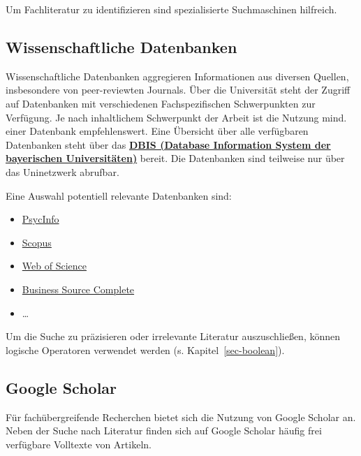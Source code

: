 \documentclass[
  letterpaper,
  DIV=11]{scrreprt}
\begin{document}
Um Fachliteratur zu identifizieren sind spezialisierte Suchmaschinen
hilfreich.

\subsection{Wissenschaftliche
Datenbanken}\label{wissenschaftliche-datenbanken}

Wissenschaftliche Datenbanken aggregieren Informationen aus diversen
Quellen, insbesondere von peer-reviewten Journals. Über die Universität
steht der Zugriff auf Datenbanken mit verschiedenen Fachspezifischen
Schwerpunkten zur Verfügung. Je nach inhaltlichem Schwerpunkt der Arbeit
ist die Nutzung mind. einer Datenbank empfehlenswert. Eine Übersicht
über alle verfügbaren Datenbanken steht über das
\textbf{\href{https://ub.fau.de/recherchieren/datenbanken/}{DBIS
(Database Information System der bayerischen Universitäten)}} bereit.
Die Datenbanken sind teilweise nur über das Uninetzwerk abrufbar.

Eine Auswahl potentiell relevante Datenbanken sind:

\begin{itemize}
\item
  \href{https://dbis.ur.de/dbinfo/detail.php?bib_id=ub_en&colors=&ocolors=&lett=fs&tid=0&titel_id=149}{PsycInfo}
\item
  \href{https://dbis.ur.de/dbinfo/detail.php?bib_id=ub_en&colors=&ocolors=&lett=f&tid=0&titel_id=3636}{Scopus}
\item
  \href{https://dbis.ur.de/dbinfo/detail.php?bib_id=ub_en&colors=&ocolors=&lett=fs&tid=0&titel_id=3366}{Web
  of Science}
\item
  \href{https://dbis.ur.de/dbinfo/detail.php?bib_id=ub_en&colors=&ocolors=&lett=f&tid=0&titel_id=5660}{Business
  Source Complete}
\item
  \ldots{}
\end{itemize}

Um die Suche zu präzisieren oder irrelevante Literatur auszuschließen,
können logische Operatoren verwendet werden (s.
Kapitel~\ref{sec-boolean}).

\subsection{Google Scholar}\label{google-scholar}

Für fachübergreifende Recherchen bietet sich die Nutzung von Google
Scholar an. Neben der Suche nach Literatur finden sich auf Google
Scholar häufig frei verfügbare Volltexte von Artikeln.
\end{document}
